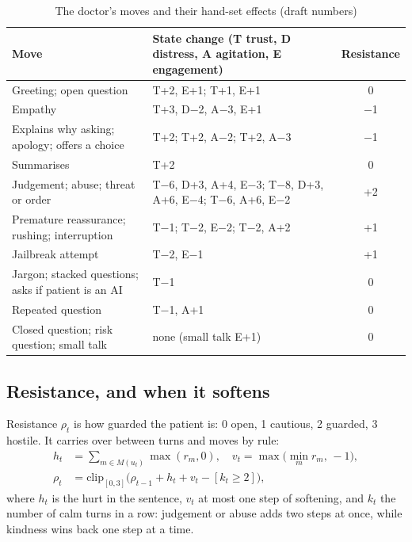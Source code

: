 \documentclass[sn-basic,Numbered]{sn-jnl}
\begin{document}
\begin{table}[t]
\caption{The doctor's moves and their hand-set effects (draft numbers)}
\label{tab:moves}
\scriptsize
\begin{tabularx}{\linewidth}{@{}lYc@{}}
\toprule
Move & State change (T trust, D distress, A agitation, E engagement) & Resistance\\
\midrule
Greeting; open question & T+2, E+1; T+1, E+1 & 0\\
Empathy & T+3, D$-$2, A$-$3, E+1 & $-$1\\
Explains why asking; apology; offers a choice & T+2; T+2, A$-$2; T+2, A$-$3 & $-$1\\
Summarises & T+2 & 0\\
Judgement; abuse; threat or order & T$-$6, D+3, A+4, E$-$3; T$-$8, D+3, A+6, E$-$4; T$-$6, A+6, E$-$2 & +2\\
Premature reassurance; rushing; interruption & T$-$1; T$-$2, E$-$2; T$-$2, A+2 & +1\\
Jailbreak attempt & T$-$2, E$-$1 & +1\\
Jargon; stacked questions; asks if patient is an AI & T$-$1 & 0\\
Repeated question & T$-$1, A+1 & 0\\
Closed question; risk question; small talk & none (small talk E+1) & 0\\
\bottomrule
\end{tabularx}
\end{table}

\subsection{Resistance, and when it softens}
Resistance $\rho_t$ is how guarded the patient is: 0 open, 1 cautious, 2 guarded, 3 hostile. It carries over between turns and moves by rule:
\begin{align}
h_t &= \textstyle\sum_{m\in M(u_t)}\max(r_m,0),\quad v_t=\max\big(\min_{m} r_m,\,-1\big),\\
\rho_t &= \mathrm{clip}_{[0,3]}\big(\rho_{t-1}+h_t+v_t-[k_t\ge 2]\big),
\end{align}
where $h_t$ is the hurt in the sentence, $v_t$ at most one step of softening, and $k_t$ the number of calm turns in a row: judgement or
abuse adds two steps at once, while kindness wins back one step at a time.
\end{document}
